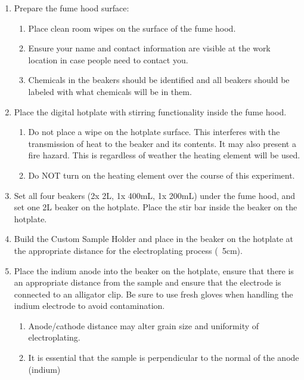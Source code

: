 \begin{center} %
    \begin{framed} %
        \begin{minipage}{0.8\textwidth} %
            \raggedright %

            \begin{enumerate}
                \item Prepare the fume hood surface:
                \begin{enumerate}
                    \item Place clean room wipes on the surface of the fume hood.
                    \item Ensure your name and contact information are visible at the work location in case people need to contact you.
                    \item Chemicals in the beakers should be identified and all beakers should be labeled with what chemicals will be in them.
                \end{enumerate}
                \item Place the digital hotplate with stirring functionality inside the fume hood.
                \begin{enumerate}
                    \item Do not place a wipe on the hotplate surface. This interferes with the transmission of heat to the beaker and its contents. It may also present a fire hazard. This is regardless of weather the heating element will be used.
                    \item Do NOT turn on the heating element over the course of this experiment.
                \end{enumerate}
                \item Set all four beakers (2x 2L, 1x 400mL, 1x 200mL) under the fume hood, and set one 2L beaker on the hotplate. Place the stir bar inside the beaker on the hotplate.
                \item Build the Custom Sample Holder and place in the beaker on the hotplate at the appropriate distance for the electroplating process (~5cm).
                \item Place the indium anode into the beaker on the hotplate, ensure that there is an appropriate distance from the sample and ensure that the electrode is connected to an alligator clip. Be sure to use fresh gloves when handling the indium electrode to avoid contamination.
                \begin{enumerate}
                    \item Anode/cathode distance may alter grain size and uniformity of electroplating.
                    \item It is essential that the sample is perpendicular to the normal of the anode (indium)
                \end{enumerate}


\end{enumerate}
\end{minipage}
\end{framed}
\end{center}
